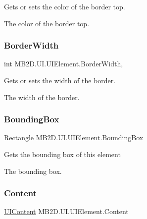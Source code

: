Gets or sets the color of the border top. 

The color of the border top.\hypertarget{class_m_b2_d_1_1_u_i_1_1_u_i_element_ad20e0ef79012021b00d67fad2b013f94}{}\label{class_m_b2_d_1_1_u_i_1_1_u_i_element_ad20e0ef79012021b00d67fad2b013f94} 
\subsubsection{\texorpdfstring{Border\+Width}{BorderWidth}}
{\footnotesize\ttfamily int M\+B2\+D.\+U\+I.\+U\+I\+Element.\+Border\+Width\hspace{0.3cm}{\ttfamily [get]}, {\ttfamily [set]}}



Gets or sets the width of the border. 

The width of the border.\hypertarget{class_m_b2_d_1_1_u_i_1_1_u_i_element_a840da120eb79b7ce0382e6c0a9d0a482}{}\label{class_m_b2_d_1_1_u_i_1_1_u_i_element_a840da120eb79b7ce0382e6c0a9d0a482} 
\subsubsection{\texorpdfstring{Bounding\+Box}{BoundingBox}}
{\footnotesize\ttfamily Rectangle M\+B2\+D.\+U\+I.\+U\+I\+Element.\+Bounding\+Box\hspace{0.3cm}{\ttfamily [get]}}



Gets the bounding box of this element 

The bounding box.\hypertarget{class_m_b2_d_1_1_u_i_1_1_u_i_element_aa8ea5b853315a074a1a745c54c83404f}{}\label{class_m_b2_d_1_1_u_i_1_1_u_i_element_aa8ea5b853315a074a1a745c54c83404f} 
\subsubsection{\texorpdfstring{Content}{Content}}
{\footnotesize\ttfamily \hyperlink{class_m_b2_d_1_1_u_i_1_1_u_i_content}{U\+I\+Content} M\+B2\+D.\+U\+I.\+U\+I\+Element.\+Content\hspace{0.3cm}{\ttfamily [get]}}



